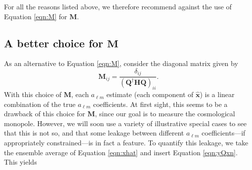 \documentclass[twocolumn,apj,numberedappendix]{emulateapj}
\newcommand{\N}{\mathbf{N}}
\newcommand{\Hmat}{\mathbf{H}}
\newcommand{\Q}{\mathbf{Q}}
\newcommand{\M}{\mathbf{M}}
\newcommand{\acl}[1]{{\color{red} \textbf{[ACL:  #1]}}}
\begin{document}
For all the reasons listed above, we therefore recommend against the use of Equation \eqref{eqn:M} for $\M$. 
%



\subsection{A better choice for $\M$}
\label{sec:BetterM}

As an alternative to Equation \eqref{eqn:M}, consider the diagonal matrix given by 
\begin{equation}
\label{eq:diagM}
\M_{ij} = \frac{\delta_{ij}}{(\Q^\dagger \Hmat \Q)_{ii}}.
\end{equation}
With this choice of $\M$, each $a_{\ell m}$ estimate (each component of $\hat{\mathbf{x}}$) is a linear combination of the true $a_{\ell m}$ coefficients. At first sight, this seems to be a drawback of this choice for $\M$, since our goal is to measure the cosmological monopole. However, we will soon use a variety of illustrative special cases to see that this is not so, and that some leakage between different $a_{\ell m}$ coefficients---if appropriately constrained---is in fact a feature. To quantify this leakage, we take the ensemble average of Equation \eqref{eqn:xhat} and insert Equation \eqref{eqn:yQxn}. This yields
%
\end{document}
